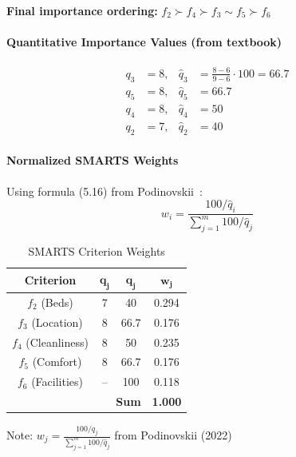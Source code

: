 \documentclass[conference]{IEEEtran}
\begin{document}
\textbf{Final importance ordering:} $f_2 \succ f_4 \succ f_3 \sim f_5 \succ f_6$

\paragraph{Quantitative Importance Values (from textbook)}

\begin{align*}
	q_3 &= 8, & \hat{q}_3 &= \frac{8-6}{9-6} \cdot 100 = 66.7 \\
	q_5 &= 8, & \hat{q}_5 &= 66.7 \\
	q_4 &= 8, & \hat{q}_4 &= 50 \\
	q_2 &= 7, & \hat{q}_2 &= 40
\end{align*}

\paragraph{Normalized SMARTS Weights}

Using formula (5.16) from Podinovskii~\cite{podinovskii2022mcdm}:
\begin{equation}
	w_i = \frac{100/\hat{q}_i}{\sum_{j=1}^{m} 100/\hat{q}_j}
\end{equation}

\begin{table}[H]
	\centering
	\caption{SMARTS Criterion Weights}
	\label{tab:hostel_smarts_weights}
	
	
	\setlength{\tabcolsep}{6pt}
	\renewcommand{\arraystretch}{1.3}
	
	\begin{tabular}{|c|c|c|c|}
		\hline
		\textbf{Criterion} & $\mathbf{q_j}$ & $\mathbf{\hat{q}_j}$ & $\mathbf{w_j}$ \\
		\hline
		$f_2$ (Beds) & 7 & 40 & 0.294 \\
		$f_3$ (Location) & 8 & 66.7 & 0.176 \\
		$f_4$ (Cleanliness) & 8 & 50 & 0.235 \\
		$f_5$ (Comfort) & 8 & 66.7 & 0.176 \\
		$f_6$ (Facilities) & -- & 100 & 0.118 \\
		\hline
		\multicolumn{3}{|r|}{\textbf{Sum}} & \textbf{1.000} \\
		\hline
	\end{tabular}
	
	\vspace{2mm}
	\footnotesize Note: $w_j = \frac{100/\hat{q}_j}{\sum_{j=1}^m 100/\hat{q}_j}$ from Podinovskii (2022)
\end{table}
\end{document}
